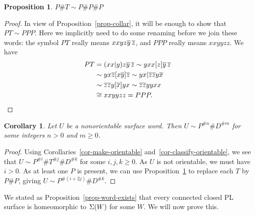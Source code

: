 \documentclass[reqno]{amsart}
\newtheorem{proposition}[theorem]{Proposition}
\newtheorem{corollary}[theorem]{Corollary}
\theoremstyle{definition}
\begin{document}
\begin{proposition}\label{prop-PPP}
 $P\# T\sim P\# P\# P$
\end{proposition}
\begin{proof}
 In view of Proposition~\ref{prop-collar}, it will be enough to show
 that $PT\sim PPP$.  Here we implicitly need to do some renaming
 before we join these words: the symbol $PT$ really means
 $xxyz\overline{y}\,\overline{z}$, and $PPP$ really means $xxyyzz$.  We have
 \begin{align*}
  PT &= (xx|y)z\overline{y}\,\overline{z}
      \sim yxx[z]\overline{y}\,\overline{z} \\
     &\sim yx\overline{z} [x\overline{y}]\overline{z} 
      \sim yx|\overline{z}\overline{z} y\overline{x} \\
     &\sim \overline{z}\overline{z} y[\overline{x}] yx  
      \sim \overline{z}\overline{z} yyxx \\
     &\cong xxyyzz = PPP.
 \end{align*}
\end{proof}

\begin{corollary}\label{cor-classify-nonorientable}
 Let $U$ be a nonorientable surface word.  Then
 $U\sim P^{\# n}\# D^{\# m}$ for some integers $n>0$ and $m\geq 0$.
\end{corollary}
\begin{proof}
 Using Corollaries~\ref{cor-make-orientable}
 and~\ref{cor-classify-orientable}, we see that
 $U\sim P^{\# i}\# T^{\# j}\# D^{\# k}$ for some $i,j,k\geq 0$.  As
 $U$ is not orientable, we must have $i>0$.  As at least one $P$ is
 present, we can use Proposition~\ref{prop-PPP} to replace each $T$ by
 $P\# P$, giving $U\sim P^{\#(i+2j)}\# D^{\# k}$.
\end{proof}

We stated as Proposition~\ref{prop-word-exists} that every connected
closed PL surface is homeomorphic to $\Sigma(W)$ for some $W$.  We will
now prove this.
\end{document}
